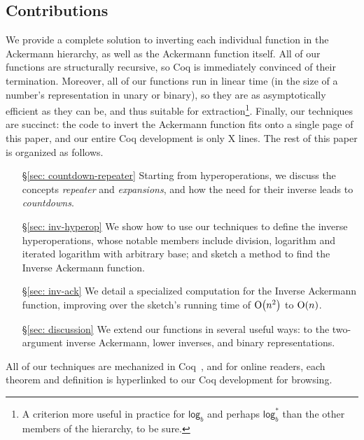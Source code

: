 \subsection{Contributions}
We provide a complete solution to inverting each individual function in the Ackermann hierarchy,
as well as the Ackermann function itself.  All of our functions are structurally recursive, so
Coq is immediately convinced of their termination.  Moreover, all of our functions run in linear
time (in the size of a number's representation in unary or binary), so they are as asymptotically efficient as they can be, and thus suitable for extraction\footnote{A criterion more useful in practice for $\mathsf{log}_b$ and perhaps $\mathsf{log}^*_b$ than the other members of the hierarchy, to be sure.}.  Finally, our techniques are succinct: the code to invert the Ackermann function fits onto a single page of this paper, and our entire Coq development is only {\color{red} X} lines. The rest of this paper is organized as follows.
\begin{itemize}
	\item[\S\ref{sec: countdown-repeater}] Starting from hyperoperations, we discuss the concepts \emph{repeater} and \emph{expansions}, and how the need for their inverse leads to \emph{countdowns}.
	\item[\S\ref{sec: inv-hyperop}] We show how to use our techniques to define the inverse hyperoperations, whose notable members include division, logarithm and iterated logarithm with arbitrary base; and sketch a method to find the Inverse Ackermann function.
	\item[\S\ref{sec: inv-ack}] We detail a specialized computation for the Inverse Ackermann function, improving over the sketch's running time of $\text{O}\big(n^2\big)$ to $\text{O}(n)$.
	\item[\S\ref{sec: discussion}] We extend our functions in several useful ways: to the two-argument inverse Ackermann, lower inverses, and binary representations.
\end{itemize}
All of our techniques are mechanized in Coq~\cite{blah}, and for online readers, 
each theorem and definition is hyperlinked to our Coq development for browsing.

